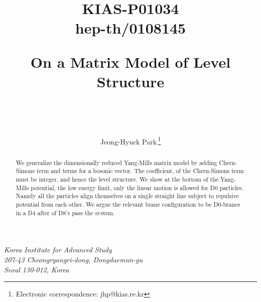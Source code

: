 \documentclass[a4paper,12pt]{article}
\begin{document}
\begin{titlepage}
\title{\vskip -60pt
{\small
\begin{flushright}
KIAS-P01034\\ hep-th/0108145
\end{flushright}}
\vskip 45pt  On  a Matrix Model of Level Structure} \vspace{4.0cm}
\author{\\
\\
\\Jeong-Hyuck Park\,\thanks{Electronic correspondence: jhp@kias.re.kr}}
\date{}
\maketitle
\vspace{-1.0cm}
\begin{center}
\textit{Korea Institute for Advanced Study}\\ \textit{207-43 Cheongryangri-dong, Dongdaemun-gu}\\ \textit{Seoul
130-012, Korea}
\end{center}
\vspace{2.0cm}
\begin{abstract}
\noindent  We generalize the   dimensionally reduced Yang-Mills matrix model by  adding  \coordHE{} Chern-Simons term
and  terms for a bosonic vector. The coefficient, \myHighlight{$\kappa$}\coordHE{} of the Chern-Simons term must be integer, and hence the
level structure.  We show at the bottom of the Yang-Mills potential, the low energy limit,  only the linear motion
is allowed for D0 particles. Namely  all the particles align themselves on a single straight line subject to
\coordHE{} repulsive potential from each other. We argue the relevant brane configuration to be  D0-branes
in a D4 after \myHighlight{$\kappa$}\coordHE{} of D8's  pass the system.
\end{abstract}

\thispagestyle{empty}
\end{titlepage}
\newpage


\end{document}
